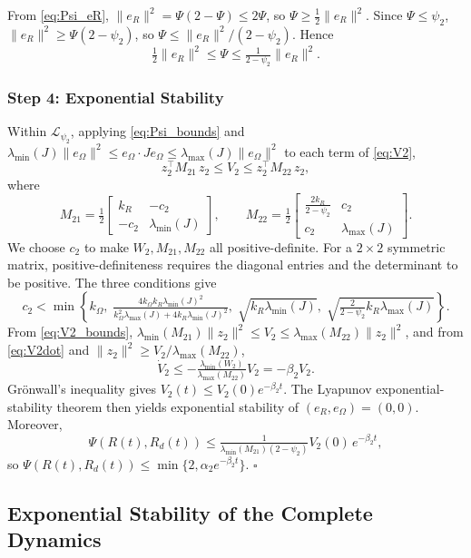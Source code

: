 \documentclass[11pt]{article}
\theoremstyle{remark}
\newcommand{\lmin}{\lambda_{\min}}
\newcommand{\lmax}{\lambda_{\max}}
\begin{document}
From \eqref{eq:Psi_eR}, $\|e_R\|^2 = \Psi(2-\Psi) \le 2\Psi$, so $\Psi \ge \tfrac{1}{2}\|e_R\|^2$. Since $\Psi\le\psi_2$, $\|e_R\|^2 \ge \Psi(2-\psi_2)$, so $\Psi \le \|e_R\|^2/(2-\psi_2)$. Hence
\begin{equation}
\tfrac{1}{2}\|e_R\|^2 \le \Psi \le \tfrac{1}{2-\psi_2}\|e_R\|^2.
\label{eq:Psi_bounds}
\end{equation}

\subsubsection*{Step 4: Exponential Stability}
Within $\mathcal{L}_{\psi_2}$, applying \eqref{eq:Psi_bounds} and $\lmin(J)\|e_\Omega\|^2 \le e_\Omega\cdot Je_\Omega \le \lmax(J)\|e_\Omega\|^2$ to each term of \eqref{eq:V2},
\begin{equation}
z_2^\top M_{21}\, z_2 \le V_2 \le z_2^\top M_{22}\, z_2,
\label{eq:V2_bounds}
\end{equation}
where
\[
M_{21} = \tfrac{1}{2}\begin{bmatrix} k_R & -c_2 \\ -c_2 & \lmin(J) \end{bmatrix}, \qquad
M_{22} = \tfrac{1}{2}\begin{bmatrix} \frac{2k_R}{2-\psi_2} & c_2 \\ c_2 & \lmax(J) \end{bmatrix}.
\]
We choose $c_2$ to make $W_2, M_{21}, M_{22}$ all positive-definite. For a $2\times 2$ symmetric matrix, positive-definiteness requires the diagonal entries and the determinant to be positive. The three conditions give
\begin{equation}
c_2 < \min\left\{k_\Omega,\; \tfrac{4k_\Omega k_R \lmin(J)^2}{k_\Omega^2\lmax(J) + 4k_R\lmin(J)^2},\; \sqrt{k_R\lmin(J)},\; \sqrt{\tfrac{2}{2-\psi_2}k_R\lmax(J)}\right\}.
\label{eq:c2_choice}
\end{equation}
From \eqref{eq:V2_bounds}, $\lmin(M_{21})\|z_2\|^2 \le V_2 \le \lmax(M_{22})\|z_2\|^2$, and from \eqref{eq:V2dot} and $\|z_2\|^2 \ge V_2/\lmax(M_{22})$,
\[
\dot V_2 \le -\tfrac{\lmin(W_2)}{\lmax(M_{22})}V_2 = -\beta_2 V_2.
\]
Gr\"onwall's inequality gives $V_2(t)\le V_2(0)e^{-\beta_2 t}$. The Lyapunov exponential-stability theorem then yields exponential stability of $(e_R, e_\Omega) = (0, 0)$. Moreover,
\[
\Psi(R(t), R_d(t)) \le \tfrac{1}{\lmin(M_{21})(2-\psi_2)} V_2(0)\,e^{-\beta_2 t},
\]
so $\Psi(R(t),R_d(t)) \le \min\{2,\alpha_2 e^{-\beta_2 t}\}$. $\square$

\subsection{Exponential Stability of the Complete Dynamics}
\label{app:prop2}
\label{sec:prop2}
\end{document}
